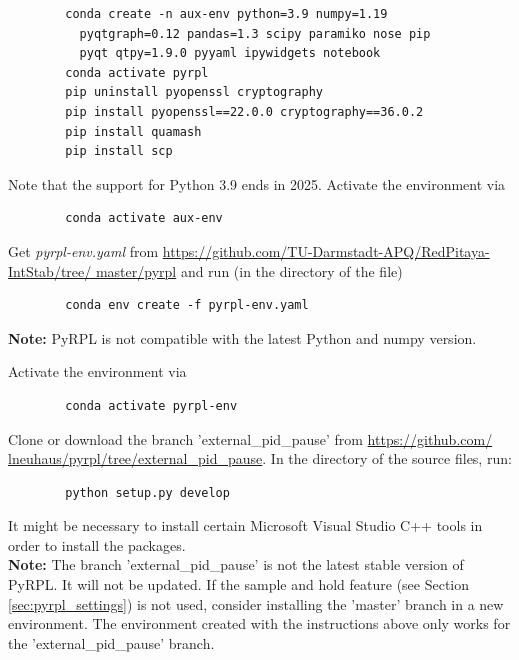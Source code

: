 \documentclass[twoside,a4paper]{refart}
\begin{document}
\begin{tcolorbox}
	\begin{verbatim}
		conda create -n aux-env python=3.9 numpy=1.19
		  pyqtgraph=0.12 pandas=1.3 scipy paramiko nose pip 
		  pyqt qtpy=1.9.0 pyyaml ipywidgets notebook
		conda activate pyrpl
		pip uninstall pyopenssl cryptography
		pip install pyopenssl==22.0.0 cryptography==36.0.2
		pip install quamash
		pip install scp
	\end{verbatim}
\end{tcolorbox}

Note that the support for Python 3.9 ends in 2025. Activate the environment via

\begin{tcolorbox}
	\begin{verbatim}
		conda activate aux-env
	\end{verbatim}
\end{tcolorbox}

Get \textit{pyrpl-env.yaml} from \href{https://github.com/TU-Darmstadt-APQ/RedPitaya-IntStab/tree/master/pyrpl}{https://github.com/TU-Darmstadt-APQ/RedPitaya-IntStab/tree/ master/pyrpl} and run (in the directory of the file) 

\begin{tcolorbox}
	\begin{verbatim}
		conda env create -f pyrpl-env.yaml
	\end{verbatim}
\end{tcolorbox}

\textbf{Note:}  PyRPL is not compatible with the latest Python and numpy version.


Activate the environment via 
\begin{tcolorbox}
	\begin{verbatim}
		conda activate pyrpl-env
	\end{verbatim}
\end{tcolorbox}
Clone or download the branch 'external\_pid\_pause' from \href{https://github.com/lneuhaus/pyrpl/tree/external_pid_pause}{https://github.com/ lneuhaus/pyrpl/tree/external\_pid\_pause}. In the directory of the source files, run:

\begin{tcolorbox}
	\begin{verbatim}
		python setup.py develop
	\end{verbatim}
\end{tcolorbox}

It might be necessary to install certain Microsoft Visual Studio C++ tools in order to install the packages. \\
\textbf{Note:} The branch 'external\_pid\_pause' is not the latest stable version of PyRPL. It will not be updated. If the sample and hold feature (see Section \ref{sec:pyrpl_settings})  is not used, consider installing the 'master' branch in a new environment. The environment created with the instructions above only works for the  'external\_pid\_pause' branch. 
\end{document}
